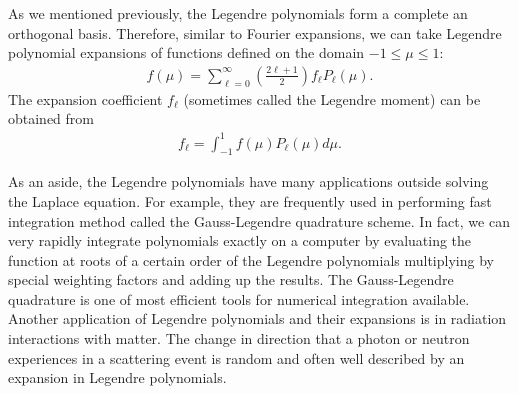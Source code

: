 As we mentioned previously, the Legendre polynomials form a complete an orthogonal basis. Therefore, similar to Fourier expansions, we can take Legendre polynomial expansions of functions defined on the domain $-1 \le \mu \le 1$:
\begin{align}
  f(\mu) = \sum_{\ell=0}^\infty \left( \frac{ 2\ell + 1 }{ 2 } \right) f_\ell P_\ell(\mu) .
\end{align}
The expansion coefficient $f_\ell$ (sometimes called the Legendre moment) can be obtained from
\begin{align}
  f_\ell = \int_{-1}^1 f(\mu) P_\ell(\mu) d\mu .
\end{align}

As an aside, the Legendre polynomials have many applications outside solving the Laplace equation. For example, they are frequently used in performing fast integration method called the Gauss-Legendre quadrature scheme. In fact, we can very rapidly integrate polynomials exactly on a computer by evaluating the function at roots of a certain order of the Legendre polynomials multiplying by special weighting factors and adding up the results. The Gauss-Legendre quadrature is one of most efficient tools for numerical integration available. Another application of Legendre polynomials and their expansions is in radiation interactions with matter. The change in direction that a photon or neutron experiences in a scattering event is random and often well described by an expansion in Legendre polynomials.

